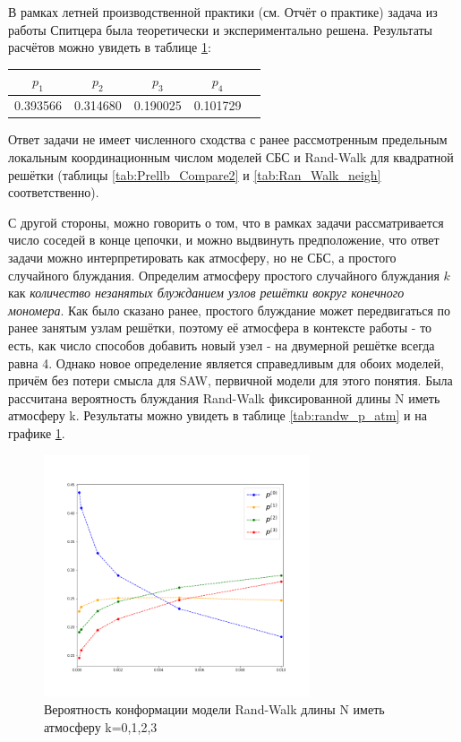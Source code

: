 В рамках летней производственной практики (см. Отчёт о практике) задача из работы Спитцера была теоретически и экспериментально решена. 
Результаты расчётов можно увидеть в таблице \ref{tab:Spitser_res}:

\begin{table}[h]
	\centering
	\begin{tabular}{|c|c|c|c|c|}
	\hline
	$p_1$ &  $p_2$ & $p_3$ &  $p_4$ \\ \hline
 	0.393566 & 0.314680 & 0.190025 & 0.101729 \\ \hline
	\end{tabular}
	\label{tab:Spitser_res}
\end{table}

Ответ задачи не имеет численного сходства с ранее рассмотренным предельным локальным координационным числом моделей СБС и Rand-Walk для квадратной решётки (таблицы \ref{tab:Prellb_Compare2} и \ref{tab:Ran_Walk_neigh} соответственно).

С другой стороны, можно говорить о том, что в рамках задачи рассматривается число соседей в конце цепочки, и можно выдвинуть предположение,
что ответ задачи можно интерпретировать как атмосферу, но не СБС, а простого случайного блуждания. 
Определим атмосферу простого случайного блуждания $k$ как \textit{количество незанятых блужданием узлов решётки вокруг конечного мономера}.
Как было сказано ранее, простого блуждание может передвигаться по ранее занятым узлам решётки, поэтому её атмосфера в контексте работы \cite{owczarek2008scaling} - то есть, как число способов добавить новый узел - на двумерной решётке всегда равна 4. 
Однако новое определение является справедливым для обоих моделей, причём без потери смысла для SAW, первичной модели для этого понятия.
Была рассчитана вероятность блуждания Rand-Walk фиксированной длины N иметь атмосферу k. 
Результаты можно увидеть в таблице \ref{tab:randw_p_atm} и на графике \ref{fig:randw_p_atm}.

\begin{figure}[h]
\centering
\includegraphics[width=0.7\textwidth]{Sections/Images_2/randwalk_p_atmos.png}
\caption{Вероятность конформации модели Rand-Walk длины N иметь атмосферу k=0,1,2,3}
\label{fig:randw_p_atm}
\end{figure}

